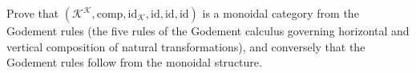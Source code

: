 Prove that $(\mathcal{K}^\mathcal{K}, \mathrm{comp}, \mathrm{id}_\mathcal{K}, \mathrm{id}, \mathrm{id}, \mathrm{id})$ is a monoidal category from the Godement rules (the five rules of the Godement calculus governing horizontal and vertical composition of natural transformations), and conversely that the Godement rules follow from the monoidal structure.
